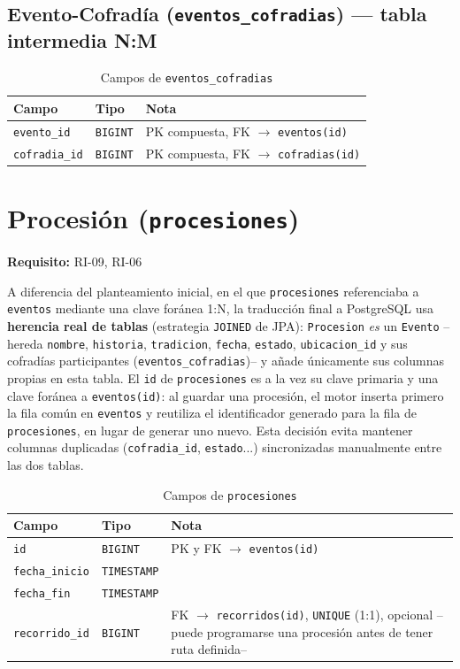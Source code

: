 \subsection{Evento-Cofradía (\texttt{eventos\_cofradias}) --- tabla intermedia N:M}
\begin{table}[H]
\centering
\begin{tabular}{|l|l|p{7cm}|}
\hline
\textbf{Campo} & \textbf{Tipo} & \textbf{Nota} \\
\hline
\texttt{evento\_id} & \texttt{BIGINT} & PK compuesta, FK $\to$ \texttt{eventos(id)} \\
\hline
\texttt{cofradia\_id} & \texttt{BIGINT} & PK compuesta, FK $\to$ \texttt{cofradias(id)} \\
\hline
\end{tabular}
\caption{Campos de \texttt{eventos\_cofradias}}
\end{table}

\section{Procesión (\texttt{procesiones})}\label{sec:procesionesBD}
\textbf{Requisito:} RI-09, RI-06

A diferencia del planteamiento inicial, en el que \texttt{procesiones} referenciaba a \texttt{eventos} mediante una clave foránea 1:N, la traducción final a PostgreSQL usa \textbf{herencia real de tablas} (estrategia \texttt{JOINED} de JPA): \texttt{Procesion} \emph{es} un \texttt{Evento} --hereda \texttt{nombre}, \texttt{historia}, \texttt{tradicion}, \texttt{fecha}, \texttt{estado}, \texttt{ubicacion\_id} y sus cofradías participantes (\texttt{eventos\_cofradias})-- y añade únicamente sus columnas propias en esta tabla. El \texttt{id} de \texttt{procesiones} es a la vez su clave primaria y una clave foránea a \texttt{eventos(id)}: al guardar una procesión, el motor inserta primero la fila común en \texttt{eventos} y reutiliza el identificador generado para la fila de \texttt{procesiones}, en lugar de generar uno nuevo. Esta decisión evita mantener columnas duplicadas (\texttt{cofradia\_id}, \texttt{estado}...) sincronizadas manualmente entre las dos tablas.

\begin{table}[H]
\centering
\begin{tabular}{|l|l|p{7cm}|}
\hline
\textbf{Campo} & \textbf{Tipo} & \textbf{Nota} \\
\hline
\texttt{id} & \texttt{BIGINT} & PK y FK $\to$ \texttt{eventos(id)} \\
\hline
\texttt{fecha\_inicio} & \texttt{TIMESTAMP} &  \\
\hline
\texttt{fecha\_fin} & \texttt{TIMESTAMP} &  \\
\hline
\texttt{recorrido\_id} & \texttt{BIGINT} & FK $\to$ \texttt{recorridos(id)}, \texttt{UNIQUE} (1:1), opcional --puede programarse una procesión antes de tener ruta definida-- \\
\hline
\end{tabular}
\caption{Campos de \texttt{procesiones}}
\end{table}

